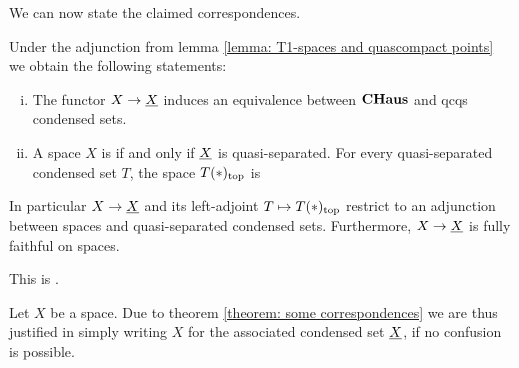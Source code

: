 We can now state the claimed correspondences.
\begin{theorem}
	\label{theorem: some correspondences}
	
	Under the adjunction from lemma \ref{lemma: T1-spaces and quascompact points} we obtain the following statements:
	\begin{enumerate}[(i)]
		\item
		The functor $X\to\underline{X}$ induces an equivalence between ${{\mathbf{CHaus}}}$ and qcqs condensed sets.
		
		\item 
		A space $X$ is \CGWH if and only if $\underline{X}$ is quasi-separated. For every quasi-separated condensed set $T$, the space ${T(\ast)_\mathrm{top}}$ is \CGWH
	\end{enumerate}
	
	In particular $X\to \underline{X}$ and its left-adjoint $T\mapsto {T(\ast)_\mathrm{top}}$ restrict to an adjunction between \CGWH spaces and quasi-separated condensed sets. Furthermore, $X\to\underline{X}$ is fully faithful on \CGWH spaces.
\end{theorem}
\begin{shortproof}
	This is \cite[Thm. 2.16]{condenseddotpdf}.
\end{shortproof}

\begin{notation}
	Let $X$ be a \CGWH space. Due to theorem \ref{theorem: some correspondences} we are thus justified in simply writing $X$ for the associated condensed set $\underline{X}$, if no confusion is possible.
\end{notation}
